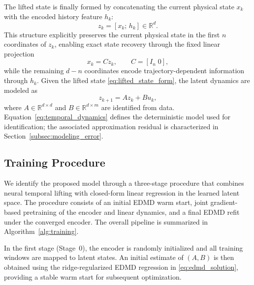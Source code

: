 \documentclass[journal]{IEEEtran}
\begin{document}
The lifted state is finally formed by concatenating the current physical state $x_k$ with the encoded history feature $h_k$:
\begin{equation}
    z_k = [x_k;\,h_k] \in \mathbb{R}^{d}.
    \label{eq:lifted_state_form}
\end{equation}
This structure explicitly preserves the current physical state in the first $n$ coordinates of $z_k$, enabling exact state recovery through the fixed linear projection
\begin{equation}
    x_k = C z_k, \qquad C = [I_n\;0],
    \label{eq:decoder_projection}
\end{equation}
while the remaining $d - n$ coordinates encode trajectory-dependent information through $h_k$. Given the lifted state \eqref{eq:lifted_state_form}, the latent dynamics are modeled as
\begin{equation}
    z_{k+1} = A z_k + B u_k,
    \label{eq:temporal_dynamics}
\end{equation}
where $A \in \mathbb{R}^{d \times d}$ and $B \in \mathbb{R}^{d \times m}$ are identified from data. Equation~\eqref{eq:temporal_dynamics} defines the deterministic model used for identification; the associated approximation residual is characterized in Section~\ref{subsec:modeling_error}.

\subsection{Training Procedure}
\label{sec:training}

We identify the proposed model through a three-stage procedure that combines neural temporal lifting with closed-form linear regression in the learned latent space. The procedure consists of an initial EDMD warm start, joint gradient-based pretraining of the encoder and linear dynamics, and a final EDMD refit under the converged encoder. The overall pipeline is summarized in Algorithm~\ref{alg:training}.

In the first stage (Stage~0), the encoder is randomly initialized and all training windows are mapped to latent states. An initial estimate of $(A,B)$ is then obtained using the ridge-regularized EDMD regression in \eqref{eq:edmd_solution}, providing a stable warm start for subsequent optimization.
\end{document}
